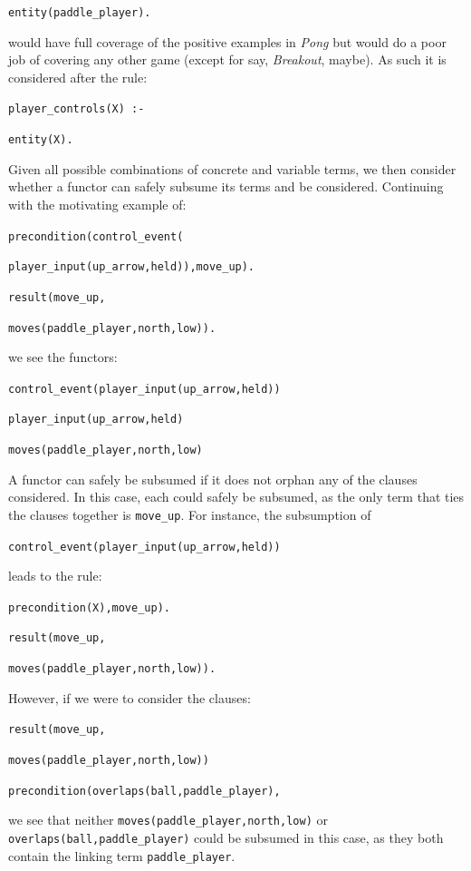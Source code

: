 \documentclass[12pt]{report}
\begin{document}
\texttt{entity(paddle\_player).}

\noindent would have full coverage of the positive examples in \textit{Pong} but would do a poor job of covering any other game (except for say, \textit{Breakout}, maybe). As such it is considered after the rule:


\noindent \texttt{player\_controls(X) :- }

\texttt{entity(X).}

Given all possible combinations of concrete and variable terms, we then consider whether a functor can safely subsume its terms and be considered. Continuing with the motivating example of:

\noindent \texttt{precondition(control\_event(}

\texttt{player\_input(up\_arrow,held)),move\_up).}

\noindent \texttt{result(move\_up,}

\texttt{moves(paddle\_player,north,low)).}

\noindent we see the functors:

\noindent \texttt{control\_event(player\_input(up\_arrow,held))}

\noindent \texttt{player\_input(up\_arrow,held)}

\noindent \texttt{moves(paddle\_player,north,low)}

A functor can safely be subsumed if it does not orphan any of the clauses considered.  In this case, each could safely be subsumed, as the only term that ties the clauses together is \texttt{move\_up}.  For instance, the subsumption of

\noindent  \texttt{control\_event(player\_input(up\_arrow,held))} 

\noindent leads to the rule:

\noindent \texttt{precondition(X),move\_up).}

\noindent \texttt{result(move\_up,}

\texttt{moves(paddle\_player,north,low)).}

However, if we were to consider the clauses:

\noindent \texttt{result(move\_up,}

\texttt{moves(paddle\_player,north,low))}


\noindent \texttt{precondition(overlaps(ball,paddle\_player),}

\noindent we see that neither \texttt{moves(paddle\_player,north,low)} or \texttt{overlaps(ball,paddle\_player)} could be subsumed in this case, as they both contain the linking term \texttt{paddle\_player}.
\end{document}

